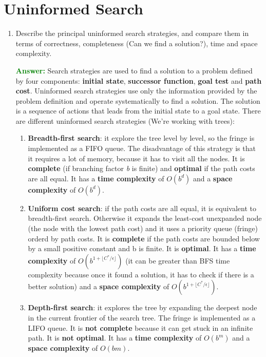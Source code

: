 \documentclass[12pt]{article}
\begin{document}
\section{Uninformed Search}
\begin{enumerate}[label=\textbf{US.\arabic*}]
    \item Describe the principal uninformed search strategies, 
    and compare them in terms of correctness, completeness (Can we find a solution?), time and space complexity.

    \textcolor{green}{\textbf{Answer:}}
    Search strategies are used to find a solution to a problem defined by four components: 
    \textbf{initial state}, \textbf{successor function}, \textbf{goal test} and \textbf{path cost}.
    Uninformed search strategies use only the information provided by the problem definition and operate systematically to find a solution.
    The solution is a sequence of actions that leads from the initial state to a goal state.
    There are different uninformed search strategies (We're working with trees):
    \begin{enumerate}
        \item \textbf{Breadth-first search}: it explore the tree level by level, 
        so the fringe is implemented as a FIFO queue.
        The disadvantage of this strategy is that it requires a lot of memory, because it has to visit all the nodes.
        It is \textbf{complete} (if branching factor \textit{b} is finite) and \textbf{optimal} if the path costs are all equal.
        It has a \textbf{time complexity} of $O(b^d)$ and a \textbf{space complexity} of $O(b^d)$.
    
        \item \textbf{Uniform cost search}: if the path costs are all equal, it is equivalent to breadth-first search.
        Otherwise it expands the least-cost unexpanded node (the node with the lowest path cost) and it uses a priority queue (fringe) 
        orderd by path costs.
        It is \textbf{complete} if the path costs are bounded below by a small positive constant and b is finite.
        It is \textbf{optimal}.
        It has a \textbf{time complexity} of $O(b^{1+\lfloor C^*/\epsilon \rfloor})$ (it can be greater than BFS time complexity because once it found a solution, it has to check if there is a better solution)
        and a \textbf{space complexity} of $O(b^{1+\lfloor C^*/\epsilon \rfloor})$.
    
        \item \textbf{Depth-first search}: it explores the tree by expanding the deepest node in the current frontier of the search tree.
        The fringe is implemented as a LIFO queue.
        It is \textbf{not complete} because it can get stuck in an infinite path.
        It is \textbf{not optimal}.
        It has a \textbf{time complexity} of $O(b^m)$ and a \textbf{space complexity} of $O(bm)$.


\end{enumerate}
\end{enumerate}
\end{document}
